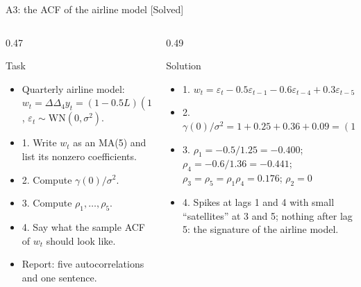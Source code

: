 \begin{frame}{A3: the ACF of the airline model [Solved]}
\itemsize{\scriptsize}
\begin{columns}[T]
\begin{column}{0.47\textwidth}
\begin{block}{Task}
\begin{itemize}
    \item Quarterly airline model: $w_t = \Delta\Delta_4 y_t = (1 - 0.5L)(1 - 0.6L^4)\varepsilon_t$, $\varepsilon_t \sim \mathrm{WN}(0, \sigma^2)$.
    \item 1. Write $w_t$ as an MA(5) and list its nonzero coefficients.
    \item 2. Compute $\gamma(0)/\sigma^2$.
    \item 3. Compute $\rho_1, \dots, \rho_5$.
    \item 4. Say what the sample ACF of $w_t$ should look like.
    \item Report: five autocorrelations and one sentence.
\end{itemize}
\end{block}
\end{column}
\begin{column}{0.49\textwidth}
\begin{exampleblock}{Solution}
\begin{itemize}
    \item 1. $w_t = \varepsilon_t - 0.5\varepsilon_{t-1} - 0.6\varepsilon_{t-4} + 0.3\varepsilon_{t-5}$
    \item 2. $\gamma(0)/\sigma^2 = 1 + 0.25 + 0.36 + 0.09 = (1 + 0.25)(1 + 0.36) = 1.70$
    \item 3. $\rho_1 = -0.5/1.25 = -0.400$; $\rho_4 = -0.6/1.36 = -0.441$; $\rho_3 = \rho_5 = \rho_1\rho_4 = 0.176$; $\rho_2 = 0$
    \item 4. Spikes at lags 1 and 4 with small ``satellites'' at 3 and 5; nothing after lag 5: the signature of the airline model.
\end{itemize}
\end{exampleblock}
\end{column}
\end{columns}
\end{frame}

